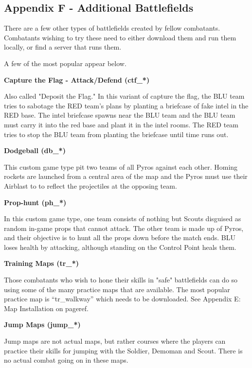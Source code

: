 \subsection{Appendix F - Additional Battlefields}
\label{Additional_Battlefields}
There are a few other types of battlefields created by fellow combatants.  Combatants wishing to try these need to either download them and run them locally, or find a server that runs them.

A few of the most popular appear below.

{\bf Capture the Flag - Attack/Defend (ctf\_*)}

Also called "Deposit the Flag." In this variant of capture the flag, the BLU team tries to sabotage the RED team's plans by planting a briefcase of fake intel in the RED base. The intel briefcase spawns near the BLU team and the BLU team must carry it into the red base and plant it in the intel rooms. The RED team tries to stop the BLU team from planting the briefcase until time runs out.

{\bf Dodgeball (db\_*)}

This custom game type pit two teams of all Pyros against each other. Homing rockets are launched from a central area of the map and the Pyros must use their Airblast to to reflect the projectiles at the opposing team.

{\bf Prop-hunt (ph\_*)}

In this custom game type, one team consists of nothing but Scouts disguised as random in-game props that cannot attack. The other team is made up of Pyros, and their objective is to hunt all the props down before the match ends. BLU loses health by attacking, although standing on the Control Point heals them.

{\bf Training Maps (tr\_*)}

Those combatants who wish to hone their skills in "safe" battlefields can do so using some of the many practice maps that are available.  The most popular practice map is “tr\_walkway” which needs to be downloaded.  See Appendix E: Map Installation on {{pageref}}.

{\bf Jump Maps (jump\_*)}

Jump maps are not actual maps, but rather courses where the players can practice their skills for jumping with the Soldier, Demoman and Scout. There is no actual combat going on in these maps.